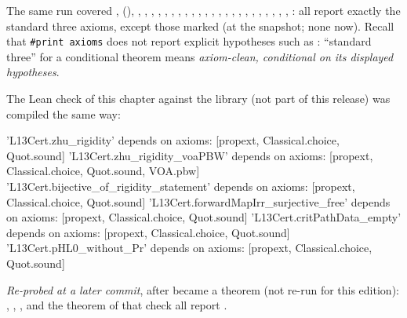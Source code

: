 {\raggedright The same run covered ,  (), , ,
, , , ,
, , , ,
, , , , ,
, , , ,
, , , , : all report exactly
the standard three axioms, except those marked  (at the snapshot; none now). Recall that \texttt{\#print axioms} does not report explicit hypotheses such
as : ``standard three'' for a conditional theorem means \emph{axiom-clean, conditional on its displayed hypotheses}.\par}
The
Lean check of this chapter against the library (not part of this release) was compiled the same way:
\begin{plaincode}
'L13Cert.zhu_rigidity' depends on axioms: [propext, Classical.choice, Quot.sound]
'L13Cert.zhu_rigidity_voaPBW' depends on axioms: [propext, Classical.choice, Quot.sound, VOA.pbw]
'L13Cert.bijective_of_rigidity_statement' depends on axioms: [propext, Classical.choice, Quot.sound]
'L13Cert.forwardMapIrr_surjective_free' depends on axioms: [propext, Classical.choice, Quot.sound]
'L13Cert.critPathData_empty' depends on axioms: [propext, Classical.choice, Quot.sound]
'L13Cert.pHL0_without_Pr' depends on axioms: [propext, Classical.choice, Quot.sound]
\end{plaincode}
\emph{Re-probed at a later commit}, after  became a theorem (not re-run for this edition):
, , ,  and the
theorem  of that check all report .

